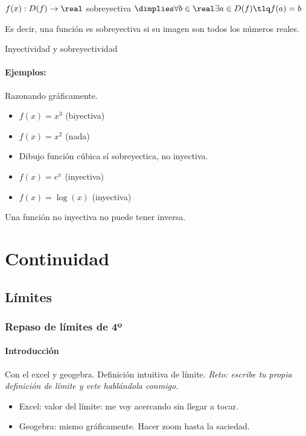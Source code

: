 \documentclass[palatino,nosec]{Docencia}
\begin{document}
\begin{defn}[Sobreyectividad]
	$f(x) : D(f) \to \real$ sobreyectiva $\dimplies \forall b\in\real \exists a\in D(f) \tlq f(a) = b$

	Es decir, una función es sobreyectiva si su imagen son todos los números reales.
\end{defn}


\begin{defn}[Biyectividad] 
	Inyectividad y sobreyectividad
\end{defn}

\paragraph{Ejemplos:} Razonando gráficamente.

\begin{itemize}
	\item $f(x) = x^3$ (biyectiva)
	\item $f(x) = x^2$ (nada)
	\item Dibujo función cúbica sí sobreyectica, no inyectiva.
	\item $f(x) = e^x$ (inyectiva)
	\item $f(x) = \log(x)$ (inyectiva)
\end{itemize}

\obs Una función no inyectiva no puede tener inversa.

\section{Continuidad}
\subsection{Límites}

\subsubsection{Repaso de límites de 4º}

\paragraph{Introducción}

Con el excel y geogebra. Definición intuitiva de límite. \textit{Reto: escribe tu propia definición de límite y vete hablándola conmigo.}

\begin{itemize}
	\item Excel: valor del límite: me voy acercando sin llegar a tocar.
	\item Geogebra: mismo gráficamente. Hacer zoom hasta la saciedad.
\end{itemize}
\end{document}
